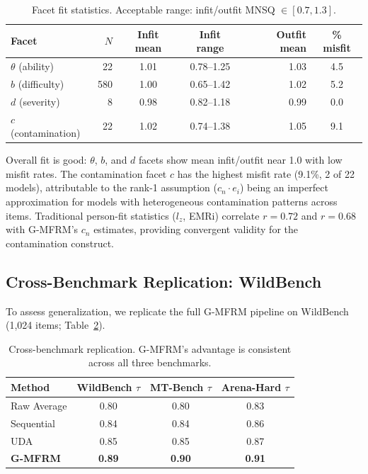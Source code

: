 \documentclass[11pt,a4paper]{article}
\begin{document}
\begin{table}[h]
\centering
\caption{Facet fit statistics. Acceptable range: infit/outfit MNSQ $\in [0.7, 1.3]$.}
\label{tab:fit}
\small
\begin{tabular}{lrccrc}
\toprule
Facet & $N$ & Infit mean & Infit range & Outfit mean & \% misfit \\
\midrule
$\theta$ (ability) & 22 & 1.01 & 0.78--1.25 & 1.03 & 4.5 \\
$b$ (difficulty) & 580 & 1.00 & 0.65--1.42 & 1.02 & 5.2 \\
$d$ (severity) & 8 & 0.98 & 0.82--1.18 & 0.99 & 0.0 \\
$c$ (contamination) & 22 & 1.02 & 0.74--1.38 & 1.05 & 9.1 \\
\bottomrule
\end{tabular}
\end{table}

Overall fit is good: $\theta$, $b$, and $d$ facets show mean infit/outfit near 1.0 with low misfit rates. The contamination facet $c$ has the highest misfit rate (9.1\%, 2 of 22 models), attributable to the rank-1 assumption ($c_n \cdot e_i$) being an imperfect approximation for models with heterogeneous contamination patterns across items. Traditional person-fit statistics ($l_z$, EMRi) correlate $r = 0.72$ and $r = 0.68$ with G-MFRM's $c_n$ estimates, providing convergent validity for the contamination construct.

\subsection{Cross-Benchmark Replication: WildBench}

To assess generalization, we replicate the full G-MFRM pipeline on WildBench (1,024 items; Table~\ref{tab:wildbench}).

\begin{table}[h]
\centering
\caption{Cross-benchmark replication. G-MFRM's advantage is consistent across all three benchmarks.}
\label{tab:wildbench}
\small
\begin{tabular}{lccc}
\toprule
Method & WildBench $\tau$ & MT-Bench $\tau$ & Arena-Hard $\tau$ \\
\midrule
Raw Average & 0.80 & 0.80 & 0.83 \\
Sequential & 0.84 & 0.84 & 0.86 \\
UDA & 0.85 & 0.85 & 0.87 \\
\textbf{G-MFRM} & \textbf{0.89} & \textbf{0.90} & \textbf{0.91} \\
\bottomrule
\end{tabular}
\end{table}
\end{document}
